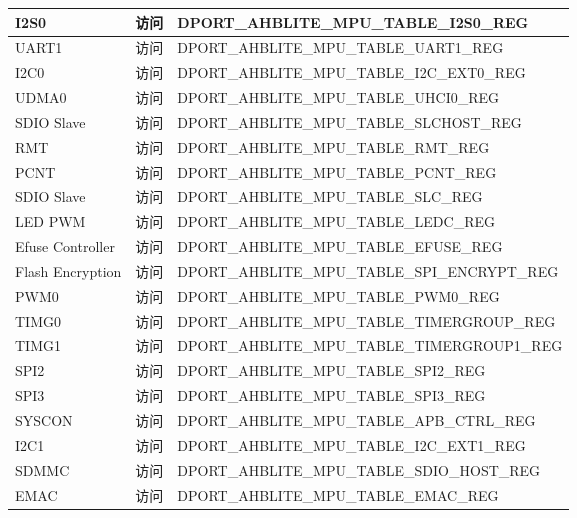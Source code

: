 \begin{longtable}[c]{|p{4cm}|p{2cm}|p{9cm}|}
    
    I2S0                  & 访问 & DPORT\_AHBLITE\_MPU\_TABLE\_I2S0\_REG \\
    \hline
    UART1                 & 访问 & DPORT\_AHBLITE\_MPU\_TABLE\_UART1\_REG \\
    \hline
    
    
    I2C0                  & 访问 & DPORT\_AHBLITE\_MPU\_TABLE\_I2C\_EXT0\_REG \\
    \hline
    UDMA0                 & 访问 & DPORT\_AHBLITE\_MPU\_TABLE\_UHCI0\_REG \\
    \hline
    SDIO Slave            & 访问 & DPORT\_AHBLITE\_MPU\_TABLE\_SLCHOST\_REG \\
    \hline
    RMT                   & 访问 & DPORT\_AHBLITE\_MPU\_TABLE\_RMT\_REG \\
    \hline
    PCNT                  & 访问 & DPORT\_AHBLITE\_MPU\_TABLE\_PCNT\_REG \\
    \hline
    SDIO Slave            & 访问 & DPORT\_AHBLITE\_MPU\_TABLE\_SLC\_REG \\
    \hline
    LED PWM               & 访问 & DPORT\_AHBLITE\_MPU\_TABLE\_LEDC\_REG \\
    \hline
    Efuse Controller     & 访问 & DPORT\_AHBLITE\_MPU\_TABLE\_EFUSE\_REG \\
    \hline
    Flash Encryption      & 访问 & DPORT\_AHBLITE\_MPU\_TABLE\_SPI\_ENCRYPT\_REG \\
    \hline
    
    
    PWM0                  & 访问 & DPORT\_AHBLITE\_MPU\_TABLE\_PWM0\_REG \\
    \hline
    TIMG0                 & 访问 & DPORT\_AHBLITE\_MPU\_TABLE\_TIMERGROUP\_REG \\
    \hline
    TIMG1                 & 访问 & DPORT\_AHBLITE\_MPU\_TABLE\_TIMERGROUP1\_REG \\
    \hline
    SPI2                  & 访问 & DPORT\_AHBLITE\_MPU\_TABLE\_SPI2\_REG \\
    \hline
    SPI3                  & 访问 & DPORT\_AHBLITE\_MPU\_TABLE\_SPI3\_REG \\
    \hline
    SYSCON                & 访问 & DPORT\_AHBLITE\_MPU\_TABLE\_APB\_CTRL\_REG \\
    \hline
    I2C1                  & 访问 & DPORT\_AHBLITE\_MPU\_TABLE\_I2C\_EXT1\_REG \\
    \hline
    SDMMC                 & 访问 & DPORT\_AHBLITE\_MPU\_TABLE\_SDIO\_HOST\_REG \\
    \hline
    EMAC                  & 访问 & DPORT\_AHBLITE\_MPU\_TABLE\_EMAC\_REG \\
    \hline
    

\end{longtable}
